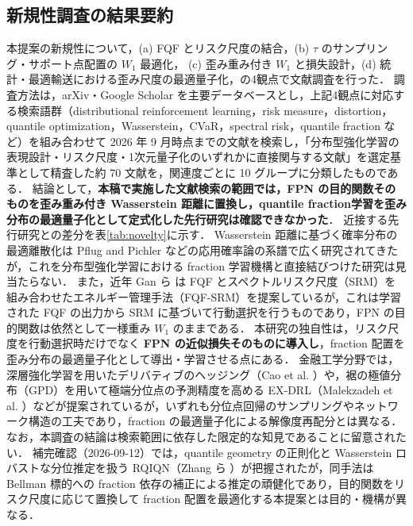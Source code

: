 \documentclass[a4paper,10pt]{jsarticle}
\theoremstyle{definition}
\newcommand{\Wone}{W_1}
\begin{document}
\subsection{新規性調査の結果要約}
本提案の新規性について，(a) FQF とリスク尺度の結合，(b) $\tau$ のサンプリング・サポート点配置の $\Wone$ 最適化，
(c) 歪み重み付き $\Wone$ と損失設計，(d) 統計・最適輸送における歪み尺度の最適量子化，の4観点で文献調査を行った．
調査方法は，arXiv・Google Scholar を主要データベースとし，上記4観点に対応する検索語群（distributional reinforcement learning，risk measure，distortion，quantile optimization，Wasserstein，CVaR，spectral risk，quantile fraction など）を組み合わせて 2026 年 9 月時点までの文献を検索し，「分布型強化学習の表現設計・リスク尺度・1次元量子化のいずれかに直接関与する文献」を選定基準として精査した約 70 文献を，関連度ごとに 10 グループに分類したものである．
結論として，\textbf{本稿で実施した文献検索の範囲では，FPN の目的関数そのものを歪み重み付き Wasserstein 距離に置換し，quantile fraction学習を歪み分布の最適量子化として定式化した先行研究は確認できなかった}．
近接する先行研究との差分を表\ref{tab:novelty}に示す．
Wasserstein 距離に基づく確率分布の最適離散化は Pflug and Pichler \cite{pflug2014multistage} などの応用確率論の系譜で広く研究されてきたが，これを分布型強化学習における fraction 学習機構と直接結びつけた研究は見当たらない．
また，近年 Gan ら \cite{gan2026energy} は FQF とスペクトルリスク尺度（SRM）を組み合わせたエネルギー管理手法（FQF-SRM）を提案しているが，これは学習された FQF の出力から SRM に基づいて行動選択を行うものであり，FPN の目的関数は依然として一様重み $W_1$ のままである．
本研究の独自性は，リスク尺度を行動選択時だけでなく \textbf{FPN の近似損失そのものに導入し}，fraction 配置を歪み分布の最適量子化として導出・学習させる点にある．
金融工学分野では，深層強化学習を用いたデリバティブのヘッジング（Cao et al. \cite{cao2021deep,cao2023gamma}）や，裾の極値分布（GPD）を用いて極端分位点の予測精度を高める EX-DRL（Malekzadeh et al. \cite{malekzadeh2024exdrl}）などが提案されているが，いずれも分位点回帰のサンプリングやネットワーク構造の工夫であり，fraction の最適量子化による解像度再配分とは異なる．
なお，本調査の結論は検索範囲に依存した限定的な知見であることに留意されたい．
補完確認（2026-09-12）では，quantile geometry の正則化と Wasserstein ロバストな分位推定を扱う RQIQN（Zhang ら \cite{zhang2026rqiqn}）が把握されたが，同手法は Bellman 標的への fraction 依存の補正による推定の頑健化であり，目的関数をリスク尺度に応じて置換して fraction 配置を最適化する本提案とは目的・機構が異なる．
\end{document}

